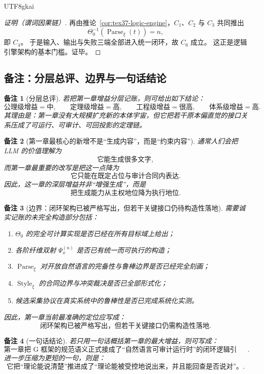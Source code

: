 \documentclass[12pt]{article}
\newtheorem{remark}{备注}[section]
\newcommand{\Parse}{\operatorname{Parse}}
\newcommand{\Style}{\operatorname{Style}}
\begin{document}
\begin{CJK*}{UTF8}{gkai}
\begin{proof}[证明（谓词因果链）]
再由推论~\ref{cor:tex37-logic-engine}，$C_1$、$C_2$ 与 $C_3$ 共同推出
\[
  \Theta_0^{-1}(\Parse_\xi(t))=n,
\]
即 $C_4$。
于是输入、输出与失败三端全部进入统一闭环，故 $C_6$ 成立。
这正是逻辑引擎架构的基本门槛。证毕。
\end{proof}

\subsection{备注：分层总评、边界与一句话结论}
\label{subsec:tex37-gain-remarks}

\begin{remark}[分层总评]
若把第一章增益分层记账，则可给出如下结论：
\[
  \text{公理级增益}=\text{中},
  \qquad
  \text{定理级增益}=\text{高},
  \qquad
  \text{工程级增益}=\text{很高},
  \qquad
  \text{体系级增益}=\text{高}.
\]
其理由是：第一章没有大规模扩充新的本体宇宙，但它把若干原本偏直觉的接口关系压成了可运行、可审计、可回投影的定理链。
\end{remark}

\begin{remark}[第一章最核心的新增不是“生成内容”，而是“约束内容”]
通常人们会把 LLM 的价值理解为
\[
  \text{它能生成很多文字},
\]
而第一章最重要的改写是把这一点降为
\[
  \text{它只能在既定占位与审计合同内表达}.
\]
因此，这一章的深层增益并非“增强生成”，而是
\[
  \text{把生成能力从主权地位降为执行地位}.
\]
\end{remark}

\begin{remark}[边界：闭环架构已被严格写出，但若干关键接口仍待构造性落地]
需要诚实记账的未完全构造部分包括：
\begin{enumerate}
  \item $\Theta_0$ 的完全可计算实现是否已经在所有目标域上给出；
  \item 各阶纤维双射 $\Psi_x^{(n)}$ 是否已有统一而可执行的构造；
  \item $\Parse_\xi$ 对开放自然语言的完备性与鲁棒边界是否已经完全刻画；
  \item $\Style_\xi$ 的合同边界与冲突裁决是否已全部形式化；
  \item 候选采集协议在真实系统中的鲁棒性是否已完成系统化实测。
\end{enumerate}
因此，第一章当前最准确的定位应写成：
\[
  \boxed{
    \text{闭环架构已被严格写出，但若干关键接口仍需构造性落地}
  }.
\]
\end{remark}

\begin{remark}[一句话结论]
若只用一句话概括第一章的最大增益，则可写成：
\[
  \boxed{
    \text{第一章把 G 框架的规范语义正式接成了“自然语言可审计运行时”的闭环逻辑引擎。}
  }.
\]
进一步压缩为更短的一句，则是：
\[
  \boxed{
    \text{它把“理论能说清楚”推进成了“理论能被受控地说出来，并且能回查是否说对”。}
  }.
\]
\end{remark}


\end{CJK*}
\end{document}
